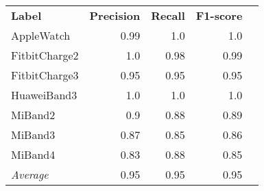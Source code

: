 \begin{tabular}{lrrrr}
    \textbf{Label} & \textbf{Precision} & \textbf{Recall} & \textbf{F1-score} \\
    AppleWatch & 0.99 & 1.0 & 1.0 \\
    FitbitCharge2 & 1.0 & 0.98 & 0.99 \\
    FitbitCharge3 & 0.95 & 0.95 & 0.95 \\
    HuaweiBand3 & 1.0 & 1.0 & 1.0 \\
    MiBand2 & 0.9 & 0.88 & 0.89 \\
    MiBand3 & 0.87 & 0.85 & 0.86 \\
    MiBand4 & 0.83 & 0.88 & 0.85 \\
    \emph{Average} & 0.95 & 0.95 & 0.95 \\
\end{tabular}